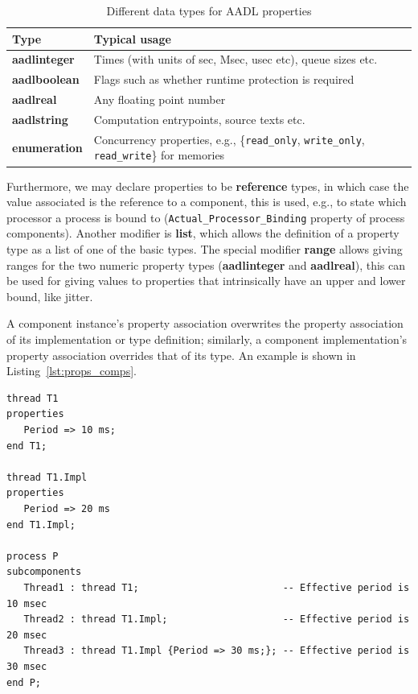 \begin{table}
\centering
\begin{tabular}{|l|l|}
\hline
\textbf{Type} & \textbf{Typical usage} \\
\hline
\textbf{aadlinteger} & Times (with units of sec, Msec, usec etc), queue sizes etc. \\
\textbf{aadlboolean} & Flags such as whether runtime protection is required \\
\textbf{aadlreal} & Any floating point number\\
\textbf{aadlstring} & Computation entrypoints, source texts etc.\\
\textbf{enumeration} & Concurrency properties, e.g., \{\texttt{read\_only},
\texttt{write\_only}, \texttt{read\_write}\} for memories\\
\hline
\end{tabular}
\caption{Different data types for AADL properties}
\label{tab:prop_types}
\end{table}

Furthermore, we may declare properties to be \textbf{reference} types,
in which case the value associated is the reference to a component,
this is used, e.g., to state which processor a process is bound to
(\texttt{Actual\_Processor\_Binding} property of process
components). Another modifier is \textbf{list}, which allows the
definition of a property type as a list of one of the basic types. The
special modifier \textbf{range} allows giving ranges for the two
numeric property types (\textbf{aadlinteger} and \textbf{aadlreal}),
this can be used for giving values to properties that intrinsically
have an upper and lower bound, like jitter.

A component instance's property association overwrites the property
association of its implementation or type definition; similarly, a
component implementation's property association overrides that of its
type. An example is shown in Listing~\ref{lst:props_comps}.

\begin{minipage}{\listingwidth}
\lstset{language=aadl,
  numbers=left,
  numberstyle=\tiny
}
\begin{lstlisting}[label=lst:props_comps, caption=Property definition
    example for components with property override semantics shown.]
thread T1
properties
   Period => 10 ms;
end T1;

thread T1.Impl
properties
   Period => 20 ms
end T1.Impl;

process P
subcomponents
   Thread1 : thread T1;                         -- Effective period is 10 msec
   Thread2 : thread T1.Impl;                    -- Effective period is 20 msec
   Thread3 : thread T1.Impl {Period => 30 ms;}; -- Effective period is 30 msec
end P;
\end{lstlisting}
\end{minipage}

